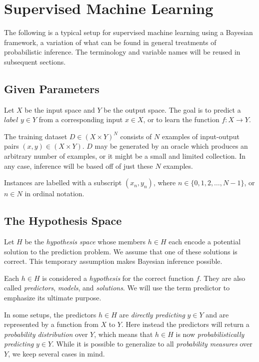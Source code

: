 \documentclass[twoside]{article}
\begin{document}
\section{Supervised Machine Learning} \label{framework}

The following is a typical setup for supervised machine learning using a Bayesian framework, a variation of what can be found in general treatments of probabilistic inference\cite{pythonbayes}\cite{gelmanbayes}\cite{blais}. The terminology and variable names will be reused in subsequent sections.

\subsection{Given Parameters}

Let \(X\) be the input space and \(Y\) be the output space. The goal is to predict a \(label\) \(y \in Y\) from a corresponding input \(x \in X\), or to learn the function \(f: X \to Y\).

The training dataset \(D \in (X \times Y)^N\) consists of \(N\) examples of input-output pairs \((x, y) \in (X \times Y) \). \(D\) may be generated by an oracle which produces an arbitrary number of examples, or it might be a small and limited collection. In any case, inference will be based off of just these \(N\) examples.

Instances are labelled with a subscript \((x_n, y_n)\), where \(n \in \{0, 1, 2,\ldots,N-1\}\), or \(n \in N\) in ordinal notation.

\subsection{The Hypothesis Space}

Let \(H\) be the \textit{hypothesis space} whose members \(h \in H\) each encode a potential solution to the prediction problem. We assume that one of these solutions is correct. This temporary assumption makes Bayesian inference possible.

Each \(h \in H\) is considered a \textit{hypothesis} for the correct function \(f\). They are also called \textit{predictors}, \textit{models}, and \textit{solutions}. We will use the term predictor to emphasize its ultimate purpose.

In some setups, the predictors \(h \in H\) are \textit{directly predicting} \(y \in Y\) and are represented by a function from \(X\) to \(Y\). Here instead the predictors will return a \textit{probability distribution} over \(Y\), which means that \(h \in H\) is now \textit{probabilistically predicting} \(y \in Y\). While it is possible to generalize to all \textit{probability measures} over \(Y\), we keep several cases in mind.
\end{document}
